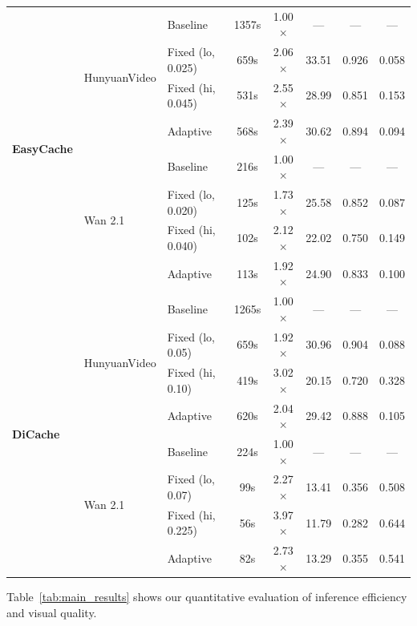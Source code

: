 \begin{table}[t]
\begin{tabular}{lllccccc}
\multirow{8}{*}{\textbf{EasyCache}}
  & \multirow{4}{*}{HunyuanVideo}
    & Baseline          & 1357s & 1.00$\times$ & ---   & ---   & ---   \\
  & & Fixed (lo, 0.025) & 659s  & 2.06$\times$ & 33.51 & 0.926 & 0.058 \\
  & & Fixed (hi, 0.045) & 531s  & 2.55$\times$ & 28.99 & 0.851 & 0.153 \\
  & & Adaptive          & 568s  & 2.39$\times$ & 30.62 & 0.894 & 0.094 \\
\cmidrule{2-8}
  & \multirow{4}{*}{Wan 2.1}
    & Baseline          & 216s  & 1.00$\times$ & ---   & ---   & ---   \\
  & & Fixed (lo, 0.020) & 125s  & 1.73$\times$ & 25.58 & 0.852 & 0.087 \\
  & & Fixed (hi, 0.040) & 102s  & 2.12$\times$ & 22.02 & 0.750 & 0.149 \\
  & & Adaptive          & 113s  & 1.92$\times$ & 24.90 & 0.833 & 0.100 \\
\midrule

\multirow{8}{*}{\textbf{DiCache}}
  & \multirow{4}{*}{HunyuanVideo}
    & Baseline          & 1265s & 1.00$\times$ & ---   & ---   & ---   \\
  & & Fixed (lo, 0.05)  & 659s  & 1.92$\times$ & 30.96 & 0.904 & 0.088 \\
  & & Fixed (hi, 0.10)  & 419s  & 3.02$\times$ & 20.15 & 0.720 & 0.328 \\
  & & Adaptive          & 620s  & 2.04$\times$ & 29.42 & 0.888 & 0.105 \\
\cmidrule{2-8}
  & \multirow{4}{*}{Wan 2.1}
    & Baseline          & 224s  & 1.00$\times$ & ---   & ---   & ---   \\
  & & Fixed (lo, 0.07)  & 99s   & 2.27$\times$ & 13.41 & 0.356 & 0.508 \\
  & & Fixed (hi, 0.225) & 56s   & 3.97$\times$ & 11.79 & 0.282 & 0.644 \\
  & & Adaptive          & 82s   & 2.73$\times$ & 13.29 & 0.355 & 0.541 \\
\bottomrule
\end{tabular}
\end{table}

Table~\ref{tab:main_results} shows our quantitative evaluation of inference efficiency and visual quality.
